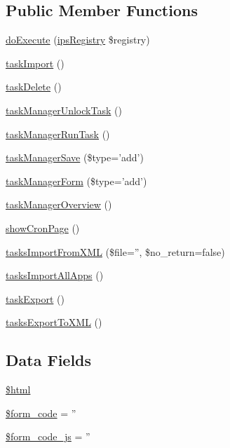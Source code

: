 \subsection*{Public Member Functions}
\begin{DoxyCompactItemize}
\item 
\hyperlink{classadmin__core__system__taskmanager_afbc4e912a0604b94d47d66744c64d8ba}{do\-Execute} (\hyperlink{classips_registry}{ips\-Registry} \$registry)
\item 
\hyperlink{classadmin__core__system__taskmanager_af635d048914f5484716551e8bbe02754}{task\-Import} ()
\item 
\hyperlink{classadmin__core__system__taskmanager_a2e4c91521705e61858aa21dce14db8c0}{task\-Delete} ()
\item 
\hyperlink{classadmin__core__system__taskmanager_abcc2a3a7414c10e2ed6b2460d611f558}{task\-Manager\-Unlock\-Task} ()
\item 
\hyperlink{classadmin__core__system__taskmanager_ac48171bc6f11e758121e3f6ddd0b50f0}{task\-Manager\-Run\-Task} ()
\item 
\hyperlink{classadmin__core__system__taskmanager_a53041c2f45cc45acf2265ddcabfa5e6d}{task\-Manager\-Save} (\$type='add')
\item 
\hyperlink{classadmin__core__system__taskmanager_a4fa135d1f29c886abc89a41114b37b1d}{task\-Manager\-Form} (\$type='add')
\item 
\hyperlink{classadmin__core__system__taskmanager_a59e80d2bb4500340c62d8373bc657c6c}{task\-Manager\-Overview} ()
\item 
\hyperlink{classadmin__core__system__taskmanager_af269985471776bb28c2b013ef4b765a0}{show\-Cron\-Page} ()
\item 
\hyperlink{classadmin__core__system__taskmanager_aa78e37952d71f38874473ba62d219d24}{tasks\-Import\-From\-X\-M\-L} (\$file='', \$no\-\_\-return=false)
\item 
\hyperlink{classadmin__core__system__taskmanager_a5770fa6f761568a59ea4f1c606439310}{tasks\-Import\-All\-Apps} ()
\item 
\hyperlink{classadmin__core__system__taskmanager_ab7a337bd5180605a3fa1c0e1b31428fb}{task\-Export} ()
\item 
\hyperlink{classadmin__core__system__taskmanager_ad9e2d671f8f9013d02f11a555dda9f63}{tasks\-Export\-To\-X\-M\-L} ()
\end{DoxyCompactItemize}
\subsection*{Data Fields}
\begin{DoxyCompactItemize}
\item 
\hyperlink{classadmin__core__system__taskmanager_a6f96e7fc92441776c9d1cd3386663b40}{\$html}
\item 
\hyperlink{classadmin__core__system__taskmanager_af28aee726fa3eb6c355d08a2ab655e03}{\$form\-\_\-code} = ''
\item 
\hyperlink{classadmin__core__system__taskmanager_ac68fe8a02a2efd63c3271179f4b4fbb7}{\$form\-\_\-code\-\_\-js} = ''
\end{DoxyCompactItemize}
